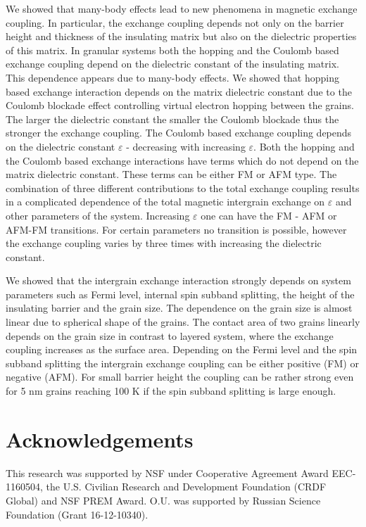 \documentclass[aps,prb,amsmath,amssymb,twocolumn,superscriptaddress,showpacs,floatfix]{revtex4-1}
\begin{document}
We showed that many-body effects lead to new phenomena in
magnetic exchange coupling. In particular, the exchange coupling
depends not only on the barrier height
and thickness of the insulating matrix but also on the dielectric properties
of this matrix. In granular systems both the hopping and the Coulomb
based exchange coupling depend on the dielectric constant of the insulating
matrix. This dependence appears due to many-body effects.
We showed that hopping based exchange interaction depends on the matrix
dielectric constant due to the Coulomb blockade effect controlling
virtual electron hopping between the grains. The larger the dielectric
constant the smaller the Coulomb blockade thus the stronger the exchange
coupling. The Coulomb based exchange coupling depends on the dielectric
constant $\varepsilon$ - decreasing with increasing $\varepsilon$.
Both the hopping and the Coulomb based exchange interactions have
terms which do not depend on the matrix dielectric constant. These terms
can be either FM or AFM type. The combination of three different
contributions to the total exchange coupling results in a complicated dependence
of the total magnetic intergrain exchange on $\varepsilon$ and other parameters
of the system. Increasing $\varepsilon$ one can have the FM - AFM or
AFM-FM transitions. For certain parameters no transition is possible,
however the exchange coupling varies by three times with
increasing the dielectric constant.

We showed that the intergrain exchange interaction strongly depends on
system parameters such as Fermi level, internal spin subband splitting,
the height of the insulating barrier and the grain size. The dependence
on the grain size is almost linear due to spherical shape of the grains.
The contact area of two grains linearly depends on the grain size in contrast to
layered system, where the exchange coupling increases as the surface area.
Depending on the Fermi level and the spin subband splitting the
intergrain exchange coupling can be either positive (FM) or negative (AFM).
For small barrier height the coupling can be rather strong even for 5 nm grains
reaching 100 K if the spin subband splitting is large enough.


\section{Acknowledgements}

This research was supported by NSF under Cooperative Agreement Award EEC-1160504,
the U.S. Civilian Research and Development Foundation (CRDF Global) and NSF PREM Award. O.U. was supported by Russian Science Foundation (Grant  16-12-10340).



\end{document}
